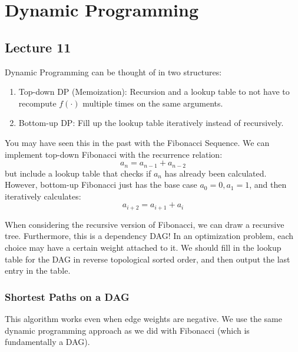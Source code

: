 \section{Dynamic Programming}

\subsection{Lecture 11}
Dynamic Programming can be thought of in
two structures:

\begin{enumerate}
    \item Top-down DP (Memoization): Recursion and a lookup table to not have to recompute $f(\cdot)$ multiple times on
    the same arguments.
    \item Bottom-up DP: Fill up the lookup table iteratively instead of recursively.
\end{enumerate}

You may have seen this in the past with the Fibonacci Sequence. We can implement top-down Fibonacci with the recurrence relation:
\[ a_n = a_{n - 1} + a_{n - 2} \]
but include a lookup table that checks if $a_n$ has already been calculated. However, bottom-up Fibonacci
just has the base case $a_0 = 0, a_1 = 1$, and then iteratively calculates:
\[ a_{i + 2} = a_{i + 1} + a_i \]

When considering the recursive version of Fibonacci, we can draw a recursive tree. Furthermore, this is a dependency DAG! In an
optimization problem, each choice may have a certain weight attached to it.
We should fill in the lookup table for the DAG in reverse topological sorted order, and then output the last entry in the table.

\subsubsection{Shortest Paths on a DAG}
This algorithm works even when edge weights are negative. We use the same dynamic programming approach as we did with
Fibonacci (which is fundamentally a DAG).


